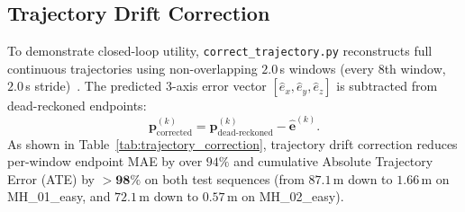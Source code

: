 \subsection{Trajectory Drift Correction}
To demonstrate closed-loop utility, \texttt{correct\_trajectory.py} reconstructs full continuous trajectories using non-overlapping $2.0$\,s windows (every 8th window, $2.0$\,s stride)~\cite{r5brossard2020}. The predicted 3-axis error vector $[\hat{e}_x, \hat{e}_y, \hat{e}_z]$ is subtracted from dead-reckoned endpoints:
\begin{equation}
\mathbf{p}_{\mathrm{corrected}}^{(k)} = \mathbf{p}_{\mathrm{dead\text{-}reckoned}}^{(k)} - \hat{\mathbf{e}}^{(k)}.
\end{equation}
As shown in Table~\ref{tab:trajectory_correction}, trajectory drift correction reduces per-window endpoint MAE by over $94\%$ and cumulative Absolute Trajectory Error (ATE) by $\mathbf{>98\%}$ on both test sequences (from $87.1$\,m down to $1.66$\,m on MH\_01\_easy, and $72.1$\,m down to $0.57$\,m on MH\_02\_easy).

\begin{table}[t]
\centering
\caption{Dead-reckoned trajectory drift correction performance (C1).}
\label{tab:trajectory_correction}
\end{table}

